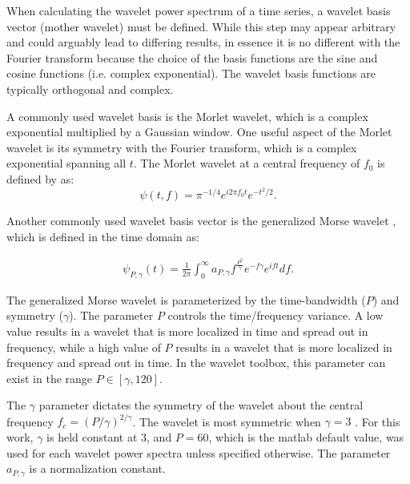 \documentclass[fleqn,usenatbib]{mnras}
\begin{document}
When calculating the wavelet power spectrum of a time series, a wavelet basis vector (mother wavelet) must be defined. While this step may appear arbitrary and could arguably lead to differing results, in essence it is no different with the Fourier transform because the choice of the basis functions are the sine and cosine functions (i.e. complex exponential).  The wavelet basis functions are typically orthogonal and complex. 

A commonly used wavelet basis is the Morlet wavelet, which is a complex exponential multiplied by a Gaussian window. One useful aspect of the Morlet wavelet is its symmetry with the Fourier transform, which is a complex exponential spanning all $t$.
The Morlet wavelet at a central frequency of $f_0$ is defined by \citet{torrence1998} as:
\begin{equation}
    \psi(t,f) = \pi^{-1/4} e^{i2\pi f_0 t} e^{-t^2/2}.
\end{equation}

Another commonly used wavelet basis vector is the generalized Morse wavelet \citep{lilly2008_morse_wavelets}, which is defined in the time domain as:

\begin{align}
    \psi_{P,\gamma} (t) = \frac{1}{2\pi} \int_{0}^{\infty} a_{P,\gamma} f^{\frac{P^2}{\gamma}} e^{-f\gamma} e^{i f t} df.
\end{align}

The generalized Morse wavelet is parameterized by the time-bandwidth ($P$) and symmetry ($\gamma$). The parameter $P$ controls the time/frequency variance. A low value results in a wavelet that is more localized in time and spread out in frequency, while a high value of $P$ results in a wavelet that is more localized in frequency and spread out in time. In the {\sc wavelet toolbox}, this parameter can exist in the range $P \in [\gamma,120]$. 

The $\gamma$ parameter dictates the symmetry of the wavelet about the central frequency $f_c = (P/\gamma)^{2/\gamma}$. The wavelet is most symmetric when $\gamma = 3$ \citep{lilly2008_morse_wavelets}. For this work, $\gamma$ is held constant at 3, and $P = 60$, which is the {\sc matlab} default value, was used for each wavelet power spectra unless specified otherwise. The parameter $a_{P,\gamma}$ is a normalization constant.

\end{document}
